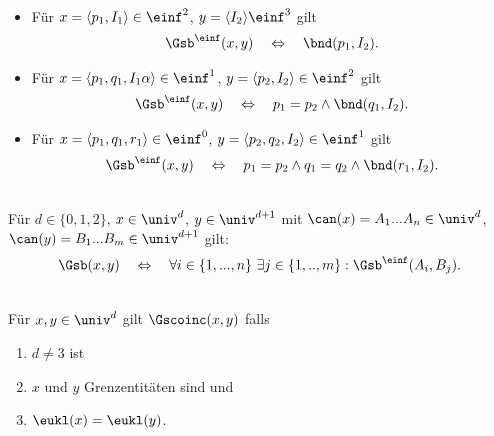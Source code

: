 \begin{dfn}[$\Gsb^\einf$]\ 
    \begin{itemize}
        \item Für $x = \langle p_1, I_1 \rangle \in \einf^2$, $y = \langle I_2 \rangle \einf^3$ gilt
            \begin{align*}
                \Gsb^\einf(x,y) 
                \quad \Leftrightarrow \quad 
                \bnd(p_1,I_2).
            \end{align*}
        \item Für $x = \langle p_1,q_1,I_1 \alpha \rangle \in \einf^1$, $y = \langle p_2,I_2 \rangle \in \einf^2$ gilt
            \begin{align*}
                \Gsb^\einf(x,y) 
                \quad \Leftrightarrow \quad 
                p_1 = p_2 \land \bnd(q_1,I_2).
            \end{align*}
        \item Für $x = \langle p_1,q_1,r_1 \rangle \in \einf^0$, $y = \langle p_2,q_2,I_2 \rangle \in \einf^1$ gilt
            \begin{align*}
                \Gsb^\einf(x,y) 
                \quad \Leftrightarrow \quad 
                p_1 = p_2 \land q_1 = q_2 \land \bnd(r_1,I_2).
            \end{align*}
    \end{itemize}
\end{dfn}


\begin{dfn}[$\Gsb$]\ \\
    Für $d \in \{0,1,2\}$, $x \in \univ^d$, $y \in \univ^{d+1}$ mit $\can(x) = A_1 ... A_n \in \univ^d$, $\can(y) = B_1 ... B_m \in \univ^{d+1}$ gilt:
    \begin{align*}
        \Gsb(x,y) \quad \Leftrightarrow \quad \forall i \in \{1, ..., n\}\ \exists j \in \{1, .., m\}: \Gsb^\einf(A_i,B_j).
    \end{align*}
\end{dfn}


\begin{dfn}[$\Gscoinc$]\ \\
    Für $x,y \in \univ^d$ gilt $\Gscoinc(x,y)$ falls
    \begin{enumerate}
        \item $d \neq 3$ ist
        \item $x$ und $y$ Grenzentitäten sind und
        \item $\eukl(x) = \eukl(y)$.
    \end{enumerate}
\end{dfn}


